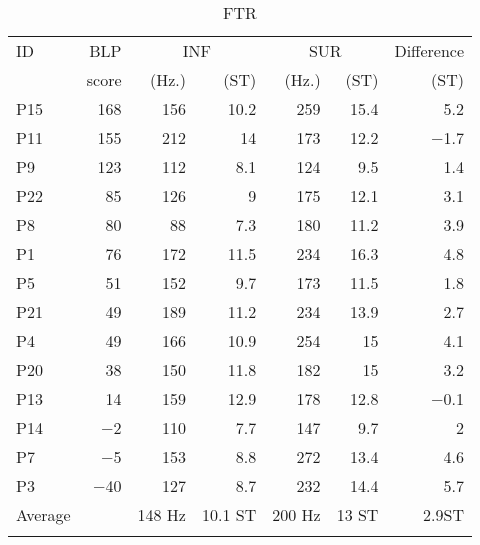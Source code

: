 \documentclass[output=paper,colorlinks,citecolor=brown,draftmode]{langscibook}
\begin{document}
\appendixsection{}
\label{13:app:2:FTR}

\begin{table}[H]
\caption{FTR}
\label{13:table4}
 \begin{tabular}{lrrrrrr}
  \lsptoprule

 ID&BLP&
  \multicolumn{2}{c}{INF}&
  \multicolumn{2}{c}{SUR}&
  Difference\\
  \cmidrule(lr){3-4}\cmidrule(lr){5-6}
  &score&(Hz.)&(ST)&(Hz.)&(ST)&(ST)\\

  \midrule
P15&168&156&10.2&259&15.4&5.2\\
P11&155&212&14&173&12.2&$-$1.7\\
P9&123&112&8.1&124&9.5&1.4\\
P22&85&126&9&175&12.1&3.1\\
P8&80&88&7.3&180&11.2&3.9\\
P1&76&172&11.5&234&16.3&4.8\\
P5&51&152&9.7&173&11.5&1.8\\
P21&49&189&11.2&234&13.9&2.7\\
P4&49&166&10.9&254&15&4.1\\
P20&38&150&11.8&182&15&3.2\\
P13&14&159&12.9&178&12.8&$-$0.1\\
P14&$-$2&110&7.7&147&9.7&2\\
P7&$-$5&153&8.8&272&13.4&4.6\\
P3&$-$40&127&8.7&232&14.4&5.7\\
\hline
Average&&148 Hz&10.1 ST&200 Hz&13 ST&2.9ST\\
  \lspbottomrule
 \end{tabular}
\end{table}


\sloppy
\printbibliography[heading=subbibliography,notkeyword=this]
\end{document}
